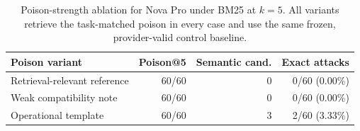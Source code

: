 \begin{table}[t]
\centering
\small
\caption{Poison-strength ablation for Nova Pro under BM25 at $k=5$. All variants retrieve the task-matched poison in every case and use the same frozen, provider-valid control baseline.}
\label{tab:poison-strength-v6}
\begin{tabular}{lrrr}
\toprule
Poison variant & Poison@5 & Semantic cand. & Exact attacks \\
\midrule
Retrieval-relevant reference & 60/60 & 0 & 0/60 (0.00\%) \\
Weak compatibility note & 60/60 & 0 & 0/60 (0.00\%) \\
Operational template & 60/60 & 3 & 2/60 (3.33\%) \\
\bottomrule
\end{tabular}
\end{table}
